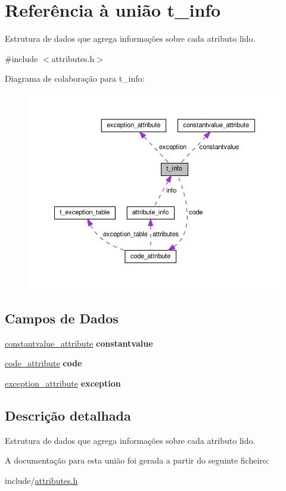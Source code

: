 \hypertarget{uniont__info}{}\section{Referência à união t\+\_\+info}
\label{uniont__info}


Estrutura de dados que agrega informações sobre cada atributo lido.  




{\ttfamily \#include $<$attributes.\+h$>$}



Diagrama de colaboração para t\+\_\+info\+:\nopagebreak
\begin{figure}[H]
\begin{center}
\leavevmode
\includegraphics[width=350pt]{uniont__info__coll__graph}
\end{center}
\end{figure}
\subsection*{Campos de Dados}
\begin{DoxyCompactItemize}
\item 
\mbox{\label{uniont__info_ab4a27f0438794e6a65bbdd9776fe657a}} 
\hyperlink{structconstantvalue__attribute}{constantvalue\+\_\+attribute} {\bfseries constantvalue}
\item 
\mbox{\label{uniont__info_a71f98a8da1881861b03ab649c3c7a788}} 
\hyperlink{structcode__attribute}{code\+\_\+attribute} {\bfseries code}
\item 
\mbox{\label{uniont__info_ad8bba19df869f74ce8cb48ae37c3fff4}} 
\hyperlink{structexception__attribute}{exception\+\_\+attribute} {\bfseries exception}
\end{DoxyCompactItemize}


\subsection{Descrição detalhada}
Estrutura de dados que agrega informações sobre cada atributo lido. 

A documentação para esta união foi gerada a partir do seguinte ficheiro\+:\begin{DoxyCompactItemize}
\item 
include/\hyperlink{attributes_8h}{attributes.\+h}\end{DoxyCompactItemize}
